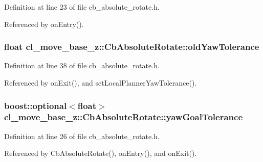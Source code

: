 Definition at line 23 of file cb\+\_\+absolute\+\_\+rotate.\+h.



Referenced by on\+Entry().

\subsubsection[{\texorpdfstring{old\+Yaw\+Tolerance}{oldYawTolerance}}]{\setlength{\rightskip}{0pt plus 5cm}float cl\+\_\+move\+\_\+base\+\_\+z\+::\+Cb\+Absolute\+Rotate\+::old\+Yaw\+Tolerance\hspace{0.3cm}{\ttfamily [private]}}\hypertarget{classcl__move__base__z_1_1CbAbsoluteRotate_a2cfcd2978e7923494e2e66107e134e27}{}\label{classcl__move__base__z_1_1CbAbsoluteRotate_a2cfcd2978e7923494e2e66107e134e27}


Definition at line 38 of file cb\+\_\+absolute\+\_\+rotate.\+h.



Referenced by on\+Exit(), and set\+Local\+Planner\+Yaw\+Tolerance().

\subsubsection[{\texorpdfstring{yaw\+Goal\+Tolerance}{yawGoalTolerance}}]{\setlength{\rightskip}{0pt plus 5cm}boost\+::optional$<$float$>$ cl\+\_\+move\+\_\+base\+\_\+z\+::\+Cb\+Absolute\+Rotate\+::yaw\+Goal\+Tolerance}\hypertarget{classcl__move__base__z_1_1CbAbsoluteRotate_a8d8b5b9c2c821efe101bb07c96c4bdd3}{}\label{classcl__move__base__z_1_1CbAbsoluteRotate_a8d8b5b9c2c821efe101bb07c96c4bdd3}


Definition at line 26 of file cb\+\_\+absolute\+\_\+rotate.\+h.



Referenced by Cb\+Absolute\+Rotate(), on\+Entry(), and on\+Exit().



